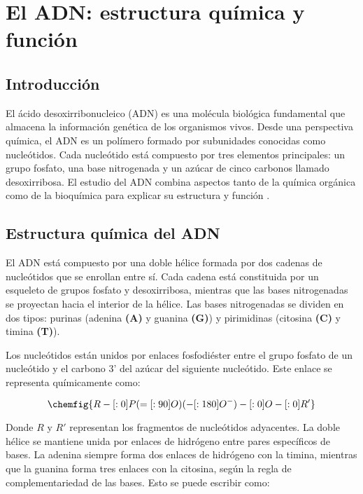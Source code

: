 \chapter{El ADN: estructura química y función}

\section{Introducción}

El ácido desoxirribonucleico (ADN) es una molécula biológica fundamental que almacena la información genética de los organismos vivos. Desde una perspectiva química, el ADN es un polímero formado por subunidades conocidas como nucleótidos. Cada nucleótido está compuesto por tres elementos principales: un grupo fosfato, una base nitrogenada y un azúcar de cinco carbonos llamado desoxirribosa. El estudio del ADN combina aspectos tanto de la química orgánica como de la bioquímica para explicar su estructura y función \parencite{@5291-TOM1999,@5290-BRUCE2002}.

\section{Estructura química del ADN}

El ADN está compuesto por una doble hélice formada por dos cadenas de nucleótidos que se enrollan entre sí. Cada cadena está constituida por un esqueleto de grupos fosfato y desoxirribosa, mientras que las bases nitrogenadas se proyectan hacia el interior de la hélice. Las bases nitrogenadas se dividen en dos tipos: purinas (adenina \textbf{(A)} y guanina \textbf{(G)}) y pirimidinas (citosina \textbf{(C)} y timina \textbf{(T)}).

Los nucleótidos están unidos por enlaces fosfodiéster entre el grupo fosfato de un nucleótido y el carbono 3' del azúcar del siguiente nucleótido. Este enlace se representa químicamente como:

\begin{equation*}
\chemfig{R-[:0]P(=[:90]O)(-[:180]O^-)-[:0]O-[:0]R'}
\end{equation*}

Donde $R$ y $R'$ representan los fragmentos de nucleótidos adyacentes. La doble hélice se mantiene unida por enlaces de hidrógeno entre pares específicos de bases. La adenina siempre forma dos enlaces de hidrógeno con la timina, mientras que la guanina forma tres enlaces con la citosina, según la regla de complementariedad de las bases. Esto se puede escribir como:

